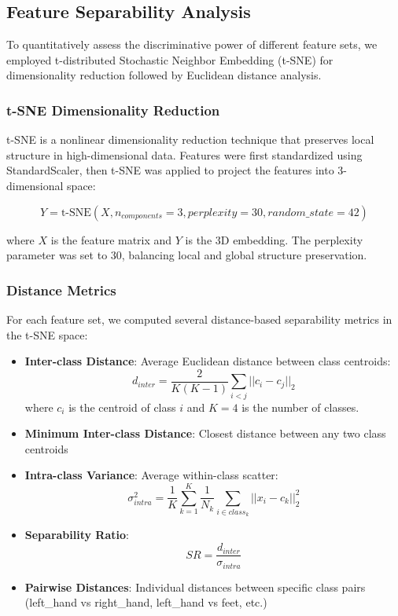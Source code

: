 \documentclass[conference]{IEEEtran}
\begin{document}
\subsection{Feature Separability Analysis}

To quantitatively assess the discriminative power of different feature sets, we employed t-distributed Stochastic Neighbor Embedding (t-SNE) for dimensionality reduction followed by Euclidean distance analysis.

\subsubsection{t-SNE Dimensionality Reduction}
t-SNE is a nonlinear dimensionality reduction technique that preserves local structure in high-dimensional data. Features were first standardized using StandardScaler, then t-SNE was applied to project the features into 3-dimensional space:

\begin{equation}
Y = \text{t-SNE}(X, n_{components}=3, perplexity=30, random\_state=42)
\end{equation}

where $X$ is the feature matrix and $Y$ is the 3D embedding. The perplexity parameter was set to 30, balancing local and global structure preservation.

\subsubsection{Distance Metrics}
For each feature set, we computed several distance-based separability metrics in the t-SNE space:

\begin{itemize}
    \item \textbf{Inter-class Distance}: Average Euclidean distance between class centroids:
    \begin{equation}
    d_{inter} = \frac{2}{K(K-1)}\sum_{i<j} ||c_i - c_j||_2
    \end{equation}
    where $c_i$ is the centroid of class $i$ and $K=4$ is the number of classes.
    
    \item \textbf{Minimum Inter-class Distance}: Closest distance between any two class centroids
    
    \item \textbf{Intra-class Variance}: Average within-class scatter:
    \begin{equation}
    \sigma_{intra}^2 = \frac{1}{K}\sum_{k=1}^{K}\frac{1}{N_k}\sum_{i \in class_k} ||x_i - c_k||_2^2
    \end{equation}
    
    \item \textbf{Separability Ratio}: 
    \begin{equation}
    SR = \frac{d_{inter}}{\sigma_{intra}}
    \end{equation}
    
    \item \textbf{Pairwise Distances}: Individual distances between specific class pairs (left\_hand vs right\_hand, left\_hand vs feet, etc.)
\end{itemize}
\end{document}
